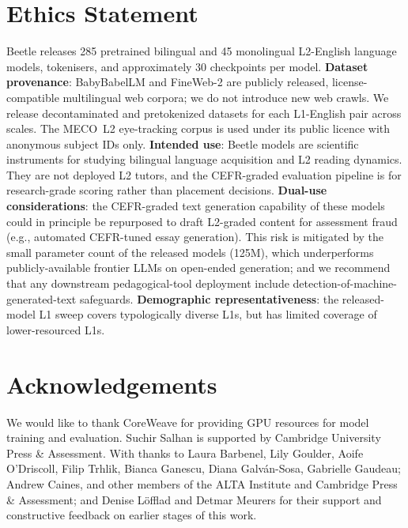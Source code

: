 \documentclass[11pt]{article}
\newcommand{\beetle}{Beetle} %
\begin{document}
\section{Ethics Statement}\label{sec:ethics}

\beetle{} releases 285 pretrained bilingual and 45 monolingual L2-English language models, tokenisers, and approximately $30$ checkpoints per model. \textbf{Dataset provenance}: BabyBabelLM and FineWeb-2 are publicly released, license-compatible multilingual web corpora; we do not introduce new web crawls. We release decontaminated and pretokenized datasets for each L1-English pair across scales. The MECO~L2 eye-tracking corpus is used under its public licence with anonymous subject IDs only.  \textbf{Intended use}: \beetle{} models are scientific instruments for studying bilingual language acquisition and L2 reading dynamics. They are not deployed L2 tutors, and the CEFR-graded evaluation pipeline is for research-grade scoring rather than placement decisions. \textbf{Dual-use considerations}: the CEFR-graded text generation capability of these models could in principle be repurposed to draft L2-graded content for assessment fraud (e.g., automated CEFR-tuned essay generation). This risk is mitigated by the small parameter count of the released models (125M), which underperforms publicly-available frontier LLMs on open-ended generation; and we recommend that any downstream pedagogical-tool deployment include detection-of-machine-generated-text safeguards. \textbf{Demographic representativeness}: the released-model L1 sweep covers  typologically diverse L1s, but has limited coverage of lower-resourced L1s. 

\section{Acknowledgements}
We would like to thank CoreWeave for providing GPU resources for model training and evaluation. Suchir Salhan is supported by Cambridge University Press \& Assessment. With thanks to Laura Barbenel, Lily Goulder, Aoife O'Driscoll, Filip Trhlik, Bianca Ganescu, Diana Galván-Sosa, Gabrielle Gaudeau; Andrew Caines, and other members of the ALTA Institute and Cambridge Press \& Assessment; and Denise L\"offlad and Detmar Meurers for their support and constructive feedback on earlier stages of this work. 





\appendix
\end{document}
